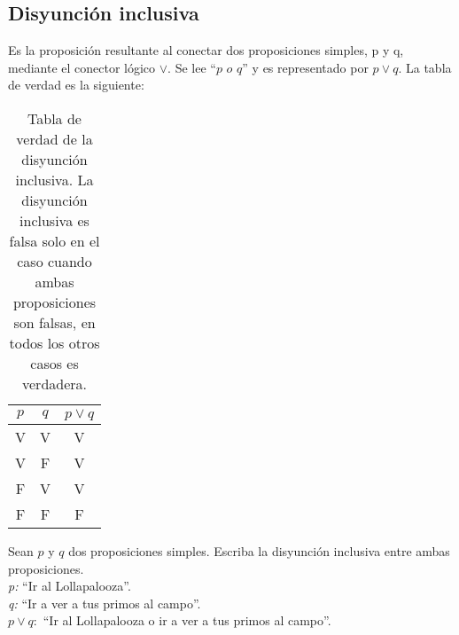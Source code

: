 \subsection{Disyunción inclusiva}
Es la proposición resultante al conectar dos proposiciones simples, p y q, mediante el conector lógico $\vee$. Se lee ``$p$ $o$ $q$'' y es representado por $p \vee q$. La tabla de verdad es la siguiente:
\begin{table}[h!]
	\begin{center}
		\begin{tabular}{|c|c|c|}
\hline
$p$&$q$&$p \vee q$\\
\hline
V&V&V\\
\hline
V&F&V\\
\hline
F&V&V\\
\hline
F&F&F\\
\hline
		\end{tabular}
	\end{center}
\caption[Tabla de verdad del operador lógico disyunción inclusiva]{Tabla de verdad de la disyunción inclusiva. La disyunción inclusiva es falsa solo en el caso cuando ambas proposiciones son falsas, en todos los otros casos es verdadera.}
\end{table}

\begin{myexample}
Sean $p$ y $q$ dos proposiciones simples. Escriba la disyunción inclusiva entre ambas proposiciones.\\

\noindent\textit{p:} ``Ir al Lollapalooza''.\\
\textit{q:} ``Ir a ver a tus primos al campo''.\\
\textit{$p\vee q:$} ``Ir al Lollapalooza o ir a ver a tus primos al campo''.
\end{myexample}


